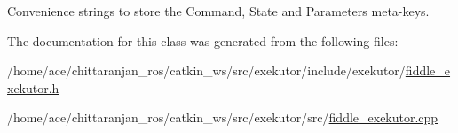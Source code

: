 \-Convenience strings to store the \-Command, \-State and \-Parameters meta-\/keys. 



\-The documentation for this class was generated from the following files\-:\begin{DoxyCompactItemize}
\item 
/home/ace/chittaranjan\-\_\-ros/catkin\-\_\-ws/src/exekutor/include/exekutor/\hyperlink{fiddle__exekutor_8h}{fiddle\-\_\-exekutor.\-h}\item 
/home/ace/chittaranjan\-\_\-ros/catkin\-\_\-ws/src/exekutor/src/\hyperlink{fiddle__exekutor_8cpp}{fiddle\-\_\-exekutor.\-cpp}\end{DoxyCompactItemize}
